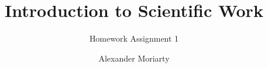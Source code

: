 \documentclass[ngerman,hyperref={pdfpagelabels=false}]{beamer}
\title{Introduction to Scientific Work}
\subtitle{Homework Assignment 1}
\author{Alexander Moriarty}
\institute[Bonn-Rhine-Sieg University of Applied Sciences]{Bonn-Rhine-Sieg University of Applied Sciences}
\date{\date{}}
\begin{document}
\begin{frame}
    \titlepage
\end{frame}
\begin{frame}
    \tableofcontents
\end{frame}




%
%
\end{document}
